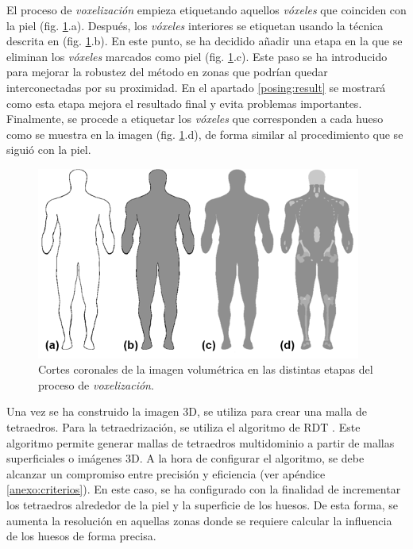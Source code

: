 El proceso de \emph{voxelización} empieza etiquetando aquellos \emph{vóxeles} que coinciden con la piel (fig. \ref{fig:voxelizacion}.a). Después, los \emph{vóxeles} interiores se etiquetan usando la técnica descrita en \cite{SUZUKI20031} (fig. \ref{fig:voxelizacion}.b).
En este punto, se ha decidido añadir una etapa en la que se eliminan los \emph{vóxeles} marcados como piel (fig. \ref{fig:voxelizacion}.c). %
Este paso se ha introducido para mejorar la robustez del método en zonas que podrían quedar interconectadas por su proximidad. 
En el apartado \ref{posing:result} se mostrará como esta etapa mejora el resultado final y evita problemas importantes. Finalmente, se procede a etiquetar los \emph{vóxeles} que corresponden a cada hueso como se muestra en la imagen (fig. \ref{fig:voxelizacion}.d), de forma similar al procedimiento que se siguió con la piel. 
%
%
\begin{figure}[th]
   \centering
    \includegraphics[width=0.95\textwidth]{IMG/Volume2.png}
    \caption{
    Cortes coronales de la imagen volumétrica en las distintas etapas del proceso de \emph{voxelización}.}
\label{fig:voxelizacion}
\end{figure}

Una vez se ha construido la imagen 3D, se utiliza para crear una malla de tetraedros. Para la tetraedrización, se utiliza el algoritmo de \ac{RDT} \cite{jamin:hal-00796052}. Este algoritmo permite generar mallas de tetraedros multidominio a partir de mallas superficiales o imágenes 3D. A la hora de configurar el algoritmo, se debe alcanzar un compromiso entre precisión y eficiencia (ver apéndice \ref{anexo:criterios}). En este caso, se ha configurado con la finalidad de incrementar los tetraedros alrededor de la piel y la superficie de los huesos. De esta forma, se aumenta la resolución en aquellas zonas donde se requiere calcular la influencia de los huesos de forma precisa.

